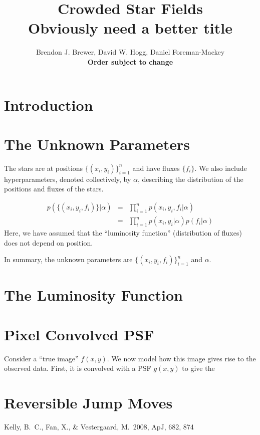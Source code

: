 \documentclass[letterpaper, 11pt]{article}
\title{Crowded Star Fields \\ \bf{Obviously need a better title}}
\author{Brendon J. Brewer, David W. Hogg, Daniel Foreman-Mackey \\ 
\bf{Order subject to change}}
\begin{document}
 \maketitle

\section{Introduction}

\section{The Unknown Parameters}
The stars are at positions $\{(x_i, 
y_i)\}_{i=1}^n$ and have fluxes $\{f_i\}$. We also include 
hyperparameters, denoted collectively, by $\alpha$, describing the 
distribution of the positions and fluxes of the stars.

\begin{eqnarray} 
p(\{(x_i, y_i, f_i)\} | \alpha) &=&
\prod_{i=1}^n p(x_i, y_i, f_i | \alpha) \\
&=& \prod_{i=1}^n p(x_i, y_i | \alpha)p(f_i | \alpha) 
\end{eqnarray}
Here, we have assumed that the ``luminosity function'' 
(distribution of fluxes) does not depend on position.

In summary, the unknown parameters are $\{(x_i, y_i, f_i)\}_{i=1}^n$
and $\alpha$.

\section{The Luminosity Function}
\citep{2008ApJ...682..874K}

\appendix
\section{Pixel Convolved PSF}
Consider a ``true image'' $f(x, y)$. We now model how this image
gives rise to the observed data. First, it is convolved with a
PSF $g(x,y)$ to give the 

\section{Reversible Jump Moves}



\begin{thebibliography}{99}
 Kelly, B.~C., Fan, X., 
\& Vestergaard, M.\ 2008, ApJ, 682, 874 
\end{thebibliography}
\end{document}
